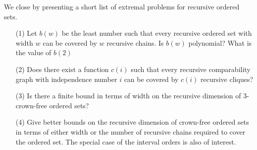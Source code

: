 \documentclass[twoside]{article}
\begin{document}
We close by presenting a short list of extremal problems for recursive ordered sets.\\

\begin{itemize}
  \item[(1)] Let $b(w)$ be the least number such that every recursive ordered set with width $w$ can be
  covered by $w$ recursive chains. Is $b(w)$ polynomial? What is the value of $b(2)$\\
  \item[(2)] Does there exist a function $c(i)$ such that every recursive comparability graph with 
  independence number $i$ can be covered by $c(i)$ recursive cliques?\\
  \item[(3)] Is there a finite bound in terms of width on the recursive dimension of 3-crown-free ordered sets?\\
  \item[(4)] Give better bounds on the recursive dimension of crown-free ordered sets in terms of either width 
  or the number of recursive chains required to cover the ordered set. The special case of the interval orders is also of interest.
\end{itemize}


\nocite{*}
\renewcommand\refname{Bibliography}


\end{document}
